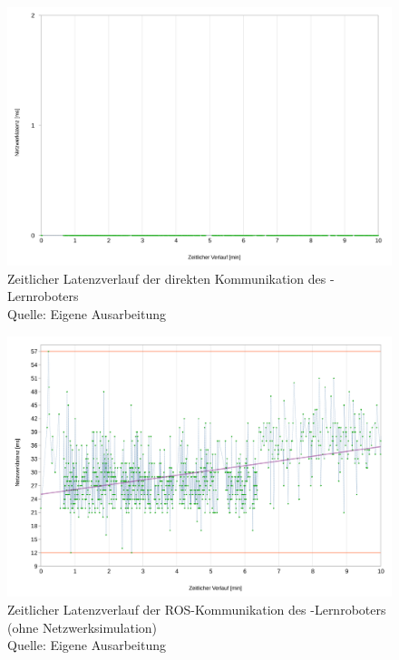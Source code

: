 \begin{figure}[htb]
	\centering
	\includegraphics[width=1.04\textwidth]{images/ergebnisse/Messung_der_direkten_Kommunikation}
	\caption[Zeitlicher Latenzverlauf der direkten Kommunikation des -Lernroboters]{Zeitlicher Latenzverlauf der direkten Kommunikation des -Lernroboters\\Quelle: Eigene Ausarbeitung}
	\label{fig:measurement_robot_direct_communication}
\end{figure}
\FloatBarrier

\begin{figure}[htb]
	\centering
	\includegraphics[width=1.04\textwidth]{images/ergebnisse/Messung_der_ROS_Kommunikation_App_und_keine_Netzwerksimulation}
	\caption[Zeitlicher Latenzverlauf der ROS-Kommunikation des -Lernroboters (ohne Netzwerksimulation)]{Zeitlicher Latenzverlauf der ROS-Kommunikation des -Lernroboters (ohne Netzwerksimulation)\\Quelle: Eigene Ausarbeitung}
	\label{fig:measurement_robot_ros_without_network_simulation}
\end{figure}
\FloatBarrier

